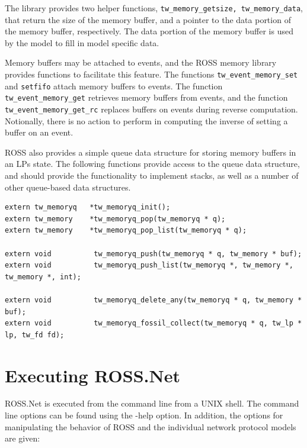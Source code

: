 \documentclass[conference,onecolumn]{IEEEtran}
\begin{document}
The library provides two helper functions, {\tt tw\_memory\_getsize, tw\_memory\_data}, that return the size of the memory buffer, and a pointer to the data portion of the memory buffer, respectively.  The data portion of the memory buffer is used by the model to fill in model specific data.

Memory buffers may be attached to events, and the ROSS memory library provides functions to facilitate this feature.  The functions {\tt tw\_event\_memory\_set} and {\tt setfifo} attach memory buffers to events.  The function {\tt tw\_event\_memory\_get} retrieves memory buffers from events, and the function {\tt tw\_event\_memory\_get\_rc} replaces buffers on events during reverse computation.  Notionally, there is no action to perform in computing the inverse of setting a buffer on an event. 

ROSS also provides a simple queue data structure for storing memory buffers in an LPs state.  The following functions provide access to the queue data structure, and should provide the functionality to implement stacks, as well as a number of other queue-based data structures.

\begin{small}\begin{verbatim}
extern tw_memoryq   *tw_memoryq_init();
extern tw_memory    *tw_memoryq_pop(tw_memoryq * q);
extern tw_memory    *tw_memoryq_pop_list(tw_memoryq * q);

extern void          tw_memoryq_push(tw_memoryq * q, tw_memory * buf);
extern void          tw_memoryq_push_list(tw_memoryq *, tw_memory *, tw_memory *, int);

extern void          tw_memoryq_delete_any(tw_memoryq * q, tw_memory * buf);
extern void          tw_memoryq_fossil_collect(tw_memoryq * q, tw_lp * lp, tw_fd fd);
\end{verbatim}\end{small}

\section{Executing ROSS.Net}

ROSS.Net is executed from the command line from a UNIX shell.  The command line options can be found using the -help option.  In addition, the options for manipulating the behavior of ROSS and the individual network protocol models are given:
\end{document}
